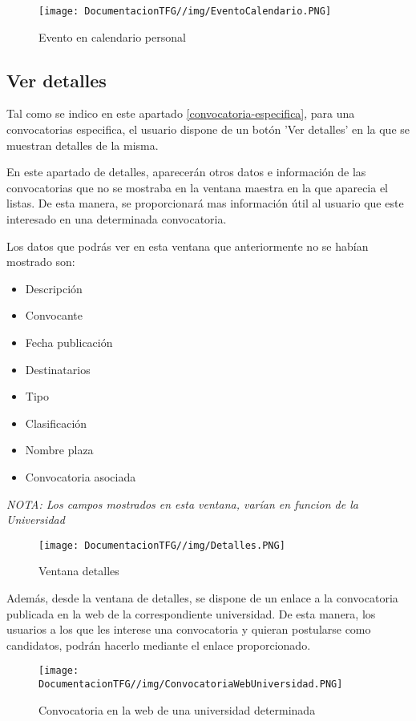 \begin{figure}[H]
    \centering
    \texttt{[image: DocumentacionTFG//img/EventoCalendario.PNG]}
    \caption{Evento en calendario personal}
    \label{fig:evento-calendario}
\end{figure}

\subsection{Ver detalles}
Tal como se indico en este apartado \ref{convocatoria-especifica}, para una convocatorias especifica, el usuario dispone de un botón 'Ver detalles' en la que se muestran detalles de la misma.

En este apartado de detalles, aparecerán otros datos e información de las convocatorias que no se mostraba en la ventana maestra en la que aparecia el listas. De esta manera, se proporcionará mas información útil al usuario que este interesado en una determinada convocatoria.

Los datos que podrás ver en esta ventana que anteriormente no se habían mostrado son:
\begin{itemize}
\item Descripción
\item Convocante
\item Fecha publicación
\item Destinatarios
\item Tipo
\item Clasificación
\item Nombre plaza
\item Convocatoria asociada
\end{itemize}

\textit{NOTA: Los campos mostrados en esta ventana, varían en funcion de la Universidad}

\begin{figure}[H]
    \centering
    \texttt{[image: DocumentacionTFG//img/Detalles.PNG]}
    \caption{Ventana detalles}
    \label{fig:ventana-detalles}
\end{figure}

Además, desde la ventana de detalles, se dispone de un enlace a la convocatoria publicada en la web de la correspondiente universidad. De esta manera, los usuarios a los que les interese una convocatoria y quieran postularse como candidatos, podrán hacerlo mediante el enlace proporcionado.

\begin{figure}[H]
    \centering
    \texttt{[image: DocumentacionTFG//img/ConvocatoriaWebUniversidad.PNG]}
    \caption{Convocatoria en la web de una universidad determinada}
    \label{fig:convocatoria-web-universidad}
\end{figure}